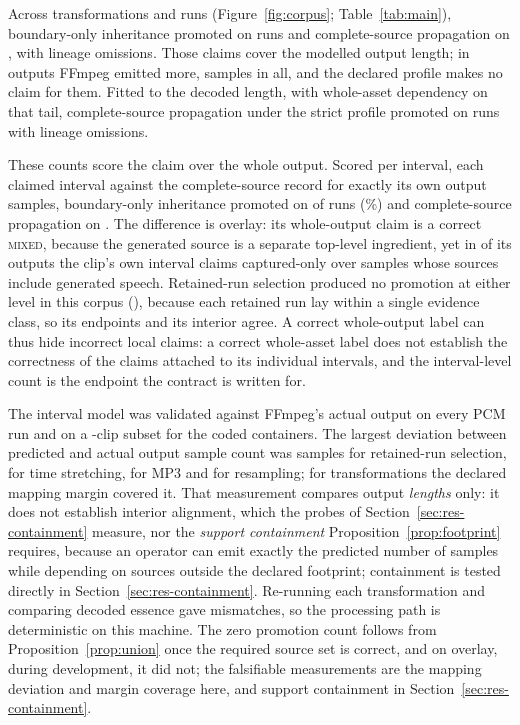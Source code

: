 \documentclass[preprint,3p,11pt,authoryear]{elsarticle}
\begin{document}
Across \Dtransforms{} transformations and \Druns{} runs
(Figure~\ref{fig:corpus}; Table~\ref{tab:main}), boundary-only inheritance
promoted on \Dbase{} runs and complete-source propagation on \Dem{}, with
\DemLineage{} lineage omissions. Those claims cover the modelled output length;
in \DfallbackOutputs{} outputs FFmpeg emitted more, \DfallbackSamples{} samples in
all, and the declared profile makes no claim for them. Fitted to the decoded
length, with whole-asset dependency on that tail, complete-source propagation
under the strict profile promoted on \DstrictPromo{} runs with \DstrictLineage{}
lineage omissions.

These counts score the claim over the whole output. Scored per interval, each
claimed interval against the complete-source record for exactly its own output
samples, boundary-only inheritance promoted on \Deither{} of \Druns{} runs
(\DeitherPct{}\%) and complete-source propagation on \DemInterval{}. The
difference is overlay: its whole-output claim is a correct \textsc{mixed},
because the generated source is a separate top-level ingredient, yet in
\DoverlayInterval{} of its outputs the clip's own interval claims captured-only
over samples whose sources include generated speech. Retained-run selection
produced no promotion at either level in this corpus (\DselInterval{}), because
each retained run lay within a single evidence class, so its endpoints and its
interior agree. A correct
whole-output label can thus hide incorrect local claims: a correct whole-asset
label does not establish the correctness of the claims attached to its individual
intervals, and the interval-level
count is the endpoint the contract is written for.

The interval model was validated against FFmpeg's actual output on every PCM
run and on a \DdetermN{}-clip subset for the coded containers. The largest
deviation between predicted and actual output sample count was \DsilenceDev{}
samples for retained-run selection, \DstretchDev{} for time stretching,
\DmpThreeDev{} for MP3 and \DresampleDev{} for resampling; for \DguardOK{}
transformations the declared mapping margin covered it. That measurement
compares output \emph{lengths} only: it does not establish interior alignment,
which the probes of Section~\ref{sec:res-containment} measure, nor the
\emph{support containment} Proposition~\ref{prop:footprint} requires, because
an operator can emit exactly the predicted number of samples while depending
on sources outside the declared footprint; containment is tested directly in
Section~\ref{sec:res-containment}. Re-running each transformation and comparing
decoded essence gave \Ddeterm{} mismatches, so the processing path is
deterministic on this machine. The zero promotion count follows from Proposition~\ref{prop:union} once the
required source set is correct, and on overlay, during development, it did not;
the falsifiable measurements are the mapping deviation and margin coverage
here, and support containment in Section~\ref{sec:res-containment}.
\end{document}
